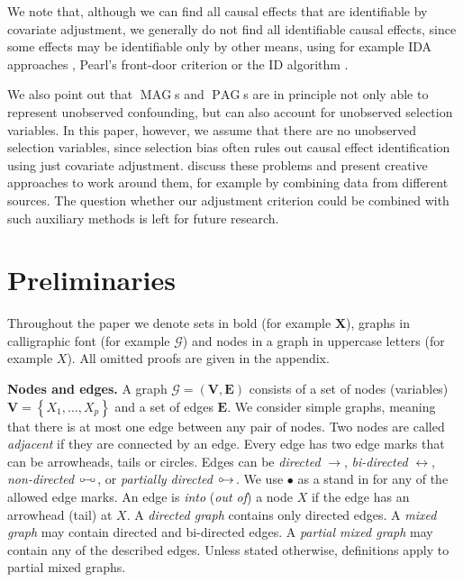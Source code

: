 \documentclass[11pt,a4paper]{article}
\DeclareMathOperator{\MAG}{MAG}
\DeclareMathOperator{\PAG}{PAG}
\newcommand{\vars}[1][V]{\mathbf{#1}}
\newcommand{\e}[1][E]{\mathbf{#1}}
\newcommand{\g}[1][G]{\mathcal{#1}}
\newcommand{\circarrow}{
  \setlength{\unitlength}{1mm}
  \begin{picture}(5,1)(0,0)
    \put(1,1){\circle{1}}
    \put(1.2,0){$\rightarrow$}
  \end{picture}
}
\newcommand{\circcirc}{
  \setlength{\unitlength}{1mm}
  \begin{picture}(5,1)(0,0)
    \put(1,1){\circle{1}}
    \put(1.5,1){\line(1,0){2}}
    \put(4,1){\circle{1}}
  \end{picture}
}
\begin{document}
We note that, although we can find all causal effects that are identifiable by covariate adjustment, we generally do not find
all identifiable causal effects, since some effects may be identifiable only by other means, using for example IDA approaches \citep{MaathuisKalischBuehlmann09, MaathuisColomboKalischBuehlmann10, nandy2014estimating, malinsky2017estimating}, 
Pearl's front-door criterion \citep[Section 3.3.2]{Pearl2009} or the ID algorithm \citep{tian2002general,shpitser2006identification}.

We also point out that $\MAG$s and $\PAG$s are in principle
not only able to represent unobserved confounding, but
can also account for unobserved selection variables.
In this paper, however, we assume that there are no
unobserved selection variables, since
selection bias often rules out causal effect identification using
just covariate adjustment. \citet{Bareinboim2014} discuss
these problems and present creative approaches to work
around them, for example by combining data from different sources.
The question whether our adjustment criterion
could be combined with such auxiliary methods
is left for future research.

\section{Preliminaries} \label{sec:prelim}


Throughout the paper we denote sets in bold (for example $\mathbf{X}$), graphs in calligraphic font (for example $\g$) and nodes in a graph in uppercase letters (for example $X$). All omitted proofs are given in the appendix.

\textbf{Nodes and edges.} A graph $\g= (\vars,\e) $ consists of a set of nodes (variables) $ \vars=\left\lbrace X_{1},\dots,X_{p}\right\rbrace$ and a set of edges $ \e $. We consider simple graphs, meaning that there is at most one edge between any pair of nodes. Two nodes are called \textit{adjacent} if they are connected by an edge. Every edge has two edge marks that can be arrowheads, tails or circles. Edges can be \emph{directed} $\rightarrow$,  \emph{bi-directed}  $\leftrightarrow$, \emph{non-directed} $\circcirc$, or \emph{partially directed} $\circarrow$. We use $\bullet$ as a stand in for any of the allowed edge marks. An edge is \textit{into} (\textit{out of}) a node $X$ if the edge has an arrowhead (tail) at $X$. A \emph{directed graph} contains only directed edges. A \emph{mixed graph} may contain directed and bi-directed edges. A \emph{partial mixed graph} may contain any of the described edges. Unless stated otherwise, definitions apply to partial mixed graphs.
\end{document}
